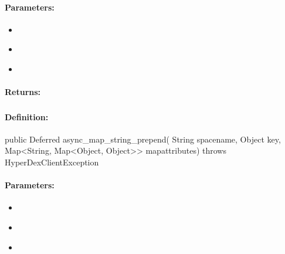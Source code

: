 \paragraph{Parameters:}
\begin{itemize}[noitemsep]
\item {}\\

\item {}\\

\item {}\\

\end{itemize}

\paragraph{Returns:}


\pagebreak
\subsubsection{}
\label{api:java:async_map_string_prepend}


\paragraph{Definition:}
\begin{javacode}
public Deferred async_map_string_prepend(
        String spacename,
        Object key,
        Map<String, Map<Object, Object>> mapattributes) throws HyperDexClientException
\end{javacode}

\paragraph{Parameters:}
\begin{itemize}[noitemsep]
\item {}\\

\item {}\\

\item {}\\

\end{itemize}

